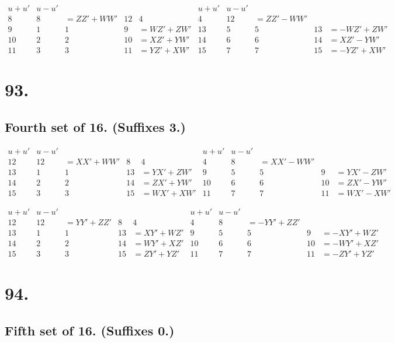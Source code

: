 \documentclass[11pt,a4paper]{book}
\begin{document}
\[
\begin{array}{c|cccc|c|cccc}
u+u' & u-u' & & & & u+u' & u-u' & & & \\
\hline
8 & 8 & = ZZ' + WW' & 12 & 4 & 4 & 12 & = ZZ' - WW' \\
9 & 1 & 1 & 9 & = WZ' + ZW' & 13 & 5 & 5 & 13 & = -WZ' + ZW' \\
10 & 2 & 2 & 10 & = XZ' + YW' & 14 & 6 & 6 & 14 & = XZ' - YW' \\
11 & 3 & 3 & 11 & = YZ' + XW' & 15 & 7 & 7 & 15 & = -YZ' + XW'
\end{array}
\]


\newpage
\section*{93.}
\label{sec:93}

\subsection*{Fourth set of 16. (Suffixes 3.)}

\[
\begin{array}{c|cccc|c|cccc}
u+u' & u-u' & & & & u+u' & u-u' & & & \\
\hline
12 & 12 & = XX' + WW' & 8 & 4 & 4 & 8 & = XX' - WW' \\
13 & 1 & 1 & 13 & = YX' + ZW' & 9 & 5 & 5 & 9 & = YX' - ZW' \\
14 & 2 & 2 & 14 & = ZX' + YW' & 10 & 6 & 6 & 10 & = ZX' - YW' \\
15 & 3 & 3 & 15 & = WX' + XW' & 11 & 7 & 7 & 11 & = WX' - XW'
\end{array}
\]

\[
\begin{array}{c|cccc|c|cccc}
u+u' & u-u' & & & & u+u' & u-u' & & & \\
\hline
12 & 12 & = YY' + ZZ' & 8 & 4 & 4 & 8 & = -YY' + ZZ' \\
13 & 1 & 1 & 13 & = XY' + WZ' & 9 & 5 & 5 & 9 & = -XY' + WZ' \\
14 & 2 & 2 & 14 & = WY' + XZ' & 10 & 6 & 6 & 10 & = -WY' + XZ' \\
15 & 3 & 3 & 15 & = ZY' + YZ' & 11 & 7 & 7 & 11 & = -ZY' + YZ'
\end{array}
\]

\newpage
\section*{94.}
\label{sec:94}

\subsection*{Fifth set of 16. (Suffixes 0.)}
\end{document}
